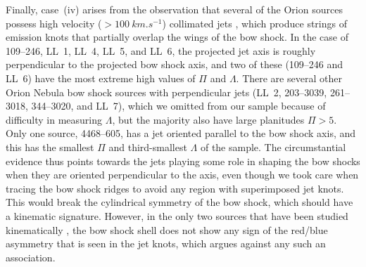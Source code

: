 Finally, case~(iv) arises from the observation that several of the
Orion sources possess high velocity (\(> \SI{100}{km.s^{-1}}\))
collimated jets \citep{Bally:2006a}, which produce strings of emission
knots that partially overlap the wings of the bow shock.  In the case
of 109--246, LL~1, LL~4, LL~5, and LL~6, the projected jet axis is
roughly perpendicular to the projected bow shock axis, and two of
these (109--246 and LL~6) have the most extreme high values of \(\Pi\)
and \(\Lambda\).  There are several other Orion Nebula bow shock sources
with perpendicular jets (LL~2, 203--3039, 261--3018, 344--3020, and
LL~7), which we omitted from our sample because of difficulty in
measuring \(\Lambda\), but the majority also have large planitudes
\(\Pi > 5\). Only one source, 4468--605, has a jet oriented parallel to
the bow shock axis, and this has the smallest \(\Pi\) and third-smallest
\(\Lambda\) of the sample.  The circumstantial evidence thus points towards
the jets playing some role in shaping the bow shocks when they are
oriented perpendicular to the axis, even though we took care when
tracing the bow shock ridges to avoid any region with superimposed jet
knots.  This would break the cylindrical symmetry of the bow shock,
which should have a kinematic signature.  However, in the only two
sources that have been studied kinematically \citep{Henney:2013a}, the
bow shock shell does not show any sign of the red/blue asymmetry that
is seen in the jet knots, which argues against any such an
association.

